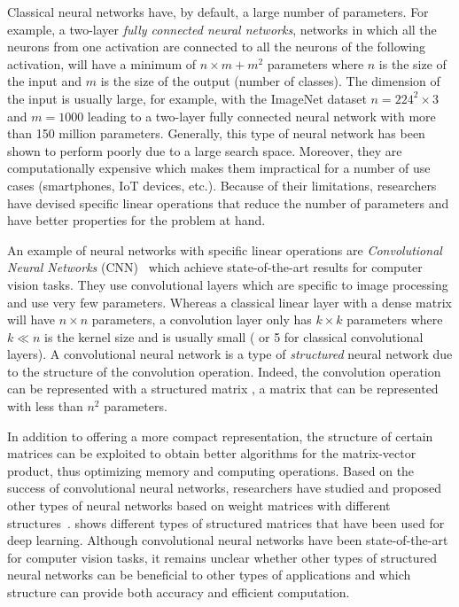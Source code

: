 Classical neural networks have, by default, a large number of parameters.
For example, a two-layer \emph{fully connected neural networks}, networks in which all the neurons from one activation are connected to all the neurons of the following activation, will have a minimum of $n \times m + m^2$ parameters where $n$ is the size of the input and $m$ is the size of the output (number of classes).
The dimension of the input is usually large, for example, with the ImageNet dataset $n = 224^2 \times 3$ and $m = 1000$ leading to a two-layer fully connected neural network with more than 150 million parameters.
Generally, this type of neural network has been shown to perform poorly due to a large search space. %
Moreover, they are computationally expensive which makes them impractical for a number of use cases (smartphones, IoT devices, etc.).
Because of their limitations, researchers have devised specific linear operations that reduce the number of parameters and have better properties for the problem at hand.

An example of neural networks with specific linear operations are \emph{Convolutional Neural Networks} (CNN)~\cite{lecun1998gradient,krizhevsky2012imagenet,he2016deep,tan2019efficientnet} which achieve state-of-the-art results for computer vision tasks.
They use convolutional layers which are specific to image processing and use very few parameters.  
Whereas a classical linear layer with a dense matrix will have $n \times n$ parameters, a convolution layer only has $k \times k$ parameters where $k \ll n$ is the kernel size and is usually small ( or 5 for classical convolutional layers).
A convolutional neural network is a type of \emph{structured} neural network due to the structure of the convolution operation.
Indeed, the convolution operation can be represented with a structured matrix \ie, a matrix that can be represented with less than $n^2$ parameters.

In addition to offering a more compact representation, the structure of certain matrices can be exploited to obtain better algorithms for the matrix-vector product, thus optimizing memory and computing operations.
Based on the success of convolutional neural networks, researchers have studied and proposed other types of neural networks based on weight matrices with different structures~\cite{moczulski2016acdc,sindhwani2015structured,denil2013predicting}.
 shows different types of structured matrices that have been used for deep learning.
Although convolutional neural networks have been state-of-the-art for computer vision tasks, it remains unclear whether other types of structured neural networks can be beneficial to other types of applications and which structure can provide both accuracy and efficient computation.

